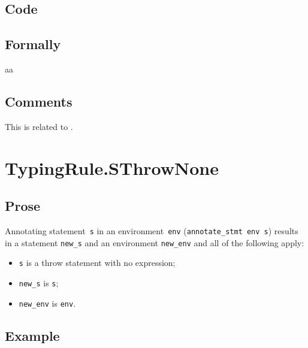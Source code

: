 \documentclass{book}
\newcommand\Ignore[0]{\texttt{\_}}
\newcommand\annotateexpr[1]{\textsf{annotate\_expr}(#1)}
\newcommand\annotatestmt[1]{\texttt{annotate\_stmt}(#1)}
\newcommand\tenv[0]{\texttt{env}}
\newcommand\newenv[0]{\texttt{new\_env}}
\newcommand\veone[0]{\texttt{e1}}
\newcommand\vetwo[0]{\texttt{e2}}
\newcommand\vs[0]{\texttt{s}}
\newcommand\vtone[0]{\texttt{t1}}
\newcommand\vttwo[0]{\texttt{t2}}
\newcommand\news[0]{\texttt{new\_s}}
\newcommand\dir[0]{\texttt{dir}}
\begin{document}
  \subsection{Code}

\begin{emptyformal}
    \subsection{Formally}
    aa
\end{emptyformal}

\subsection{Comments}
    This is related to .


\section{TypingRule.SThrowNone \label{sec:TypingRule.SThrowNone}}

  \subsection{Prose}
Annotating statement~\texttt{s} in an environment~\texttt{env}
(\texttt{annotate\_stmt env s}) results in a statement \texttt{new\_s} and an
environment \texttt{new\_env} and all of the following apply:
   \begin{itemize}
   \item \texttt{s} is a throw statement with no expression;
   \item \texttt{new\_s} is \texttt{s};
   \item \texttt{new\_env} is \texttt{env}.
   \end{itemize}

  \subsection{Example}
\end{document}
